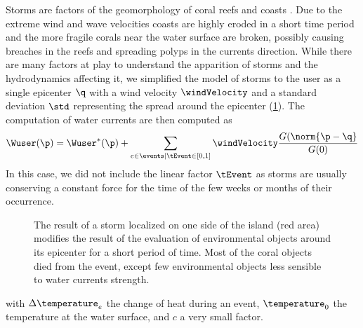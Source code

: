Storms are factors of the geomorphology of coral reefs \cite{VilaConcejo2016, Oron2023} and coasts \cite{Dominguez2005, Cowart2010}. Due to the extreme wind and wave velocities coasts are highly eroded in a short time period and the more fragile corals near the water surface are broken, possibly causing breaches in the reefs and spreading polyps in the currents direction. While there are many factors at play to understand the apparition of storms and the hydrodynamics affecting it, we simplified the model of storms to the user as a single epicenter $\q$ with a wind velocity $\windVelocity$ and a standard deviation $\std$ representing the spread around the epicenter (\cref{fig:env-obj_storm-event}). The computation of water currents are then computed as 
\begin{align*}
    \Wuser(\p) = \Wuser^*(\p) + \sum_{e \in \events | \tEvent \in [0, 1]} {\windVelocity \frac{G(\norm{\p - \q}}{G(0)}}
\end{align*}
In this case, we did not include the linear factor $\tEvent$ as storms are usually conserving a constant force for the time of the few weeks or months of their occurrence. 

\begin{figure}
    \caption{The result of a storm localized on one side of the island (red area) modifies the result of the evaluation of environmental objects around its epicenter for a short period of time. Most of the coral objects died from the event, except few environmental objects less sensible to water currents strength. }
    \label{fig:env-obj_storm-event}
\end{figure}

with $\Delta \temperature_e$ the change of heat during an event, $\temperature_0$ the temperature at the water surface, and $c$ a very small factor.

